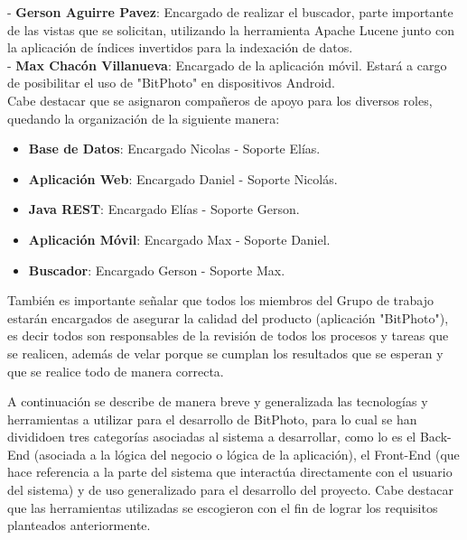 \documentclass{memoria}
\begin{document}
- \textbf{Gerson Aguirre Pavez}: Encargado de realizar el buscador, parte importante de las vistas que se solicitan, utilizando la herramienta Apache Lucene junto con la aplicación de índices invertidos para la indexación de datos.\\

- \textbf{Max Chacón Villanueva}: Encargado de la aplicación móvil. Estará a cargo de posibilitar el uso de "BitPhoto" en dispositivos Android.\\


Cabe destacar que se asignaron compañeros de apoyo para los diversos roles, quedando la organización de la siguiente manera:

\begin{itemize}
	\item \textbf{Base de Datos}: Encargado Nicolas - Soporte Elías.
	\item \textbf{Aplicación Web}: Encargado Daniel - Soporte Nicolás.
	\item \textbf{Java REST}: Encargado Elías - Soporte Gerson.
	\item \textbf{Aplicación Móvil}: Encargado Max - Soporte Daniel.
	\item \textbf{Buscador}: Encargado Gerson - Soporte Max.
\end{itemize}

También es importante señalar que todos los miembros del Grupo de trabajo estarán encargados de asegurar la calidad del producto (aplicación "BitPhoto"), es decir todos son responsables de la revisión de todos los procesos y tareas que se realicen, además de velar porque se cumplan los resultados que se esperan y que se realice todo de manera correcta.

\newpage


A continuación se describe de manera breve y generalizada las tecnologías y herramientas a utilizar para el desarrollo de BitPhoto, para lo cual se han divididoen tres categorías asociadas al sistema a desarrollar, como lo es el Back-End (asociada a la lógica del negocio o lógica de la aplicación), el Front-End (que hace referencia a la parte del sistema que interactúa directamente con el usuario del sistema) y de uso generalizado para el desarrollo del proyecto.  Cabe destacar que las herramientas utilizadas se escogieron con el fin de lograr los requisitos planteados anteriormente.\\

\end{document}
